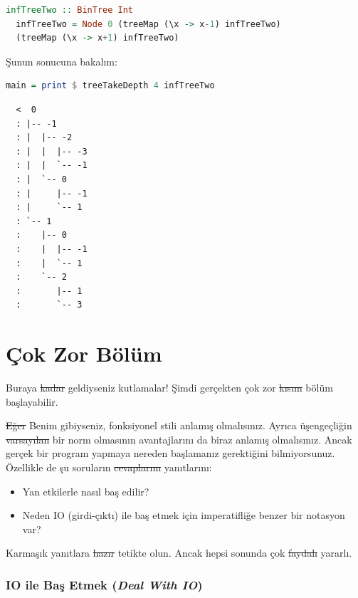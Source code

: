 \documentclass[a4paper,14pt,openany]{extbook} %
\let\emph\textit
\begin{document}
\begin{lstlisting}[language=Haskell]
  infTreeTwo :: BinTree Int
  infTreeTwo = Node 0 (treeMap (\x -> x-1) infTreeTwo)
  (treeMap (\x -> x+1) infTreeTwo)
\end{lstlisting}

Şunun sonucuna bakalım:

\begin{lstlisting}[language=Haskell]
  main = print $ treeTakeDepth 4 infTreeTwo
\end{lstlisting}

\begin{lstlisting}
  <  0
  : |-- -1
  : |  |-- -2
  : |  |  |-- -3
  : |  |  `-- -1
  : |  `-- 0
  : |     |-- -1
  : |     `-- 1
  : `-- 1
  :    |-- 0
  :    |  |-- -1
  :    |  `-- 1
  :    `-- 2
  :       |-- 1
  :       `-- 3
\end{lstlisting}


\part{Çok Zor Bölüm}\label{uxe7ok-zor-kux131sux131m}

Buraya \st{kadar} geldiyseniz kutlamalar! Şimdi gerçekten çok zor \st{kısım}
 bölüm başlayabilir.

\st{Eğer} Benim gibiyseniz, fonksiyonel stili anlamış olmalısınız. Ayrıca
üşengeçliğin \st{varsayılan} bir norm olmasının avantajlarını da biraz anlamış
olmalısınız. Ancak gerçek bir program yapmaya nereden başlamanız
gerektiğini bilmiyorsunuz. Özellikle de şu soruların \st{cevaplarını} yanıtlarını:
\begin{itemize}
\item Yan etkilerle nasıl baş edilir?
\item Neden IO (girdi-çıktı) ile baş etmek için imperatifliğe benzer bir notasyon var?
\end{itemize}

Karmaşık yanıtlara \st{hazır} tetikte olun. Ancak hepsi sonunda çok \st{faydalı} yararlı.


\section{IO ile Baş Etmek (\emph{Deal With IO})}\label{io-ile-baux15f-etmek}
\end{document}
